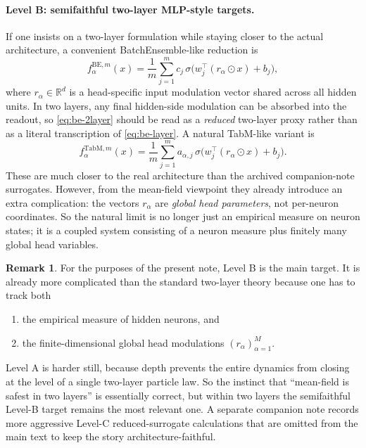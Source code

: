\documentclass[11pt]{article}
\theoremstyle{definition}
\newtheorem{remark}[theorem]{Remark}
\newcommand{\R}{\mathbb{R}}
\begin{document}
\paragraph{Level B: semifaithful two-layer MLP-style targets.}
If one insists on a two-layer formulation while staying closer to the actual architecture, a convenient BatchEnsemble-like reduction is
\begin{equation}
  f_{\alpha}^{\mathrm{BE},m}(x)
  =
  \frac1m\sum_{j=1}^m
  c_j\,\sigma\bigl(w_j^\top (r_\alpha\odot x)+b_j\bigr),
  \label{eq:be-2layer}
\end{equation}
where $r_\alpha\in\R^d$ is a head-specific input modulation vector shared across all hidden units.
In two layers, any final hidden-side modulation can be absorbed into the readout, so \eqref{eq:be-2layer} should be read as a \emph{reduced} two-layer proxy rather than as a literal transcription of \eqref{eq:be-layer}.
A natural TabM-like variant is
\begin{equation}
  f_{\alpha}^{\mathrm{TabM},m}(x)
  =
  \frac1m\sum_{j=1}^m
  a_{\alpha,j}\,\sigma\bigl(w_j^\top (r_\alpha\odot x)+b_j\bigr).
  \label{eq:tabm-2layer}
\end{equation}
These are much closer to the real architecture than the archived companion-note surrogates.
However, from the mean-field viewpoint they already introduce an extra complication:
the vectors $r_\alpha$ are \emph{global head parameters}, not per-neuron coordinates.
So the natural limit is no longer just an empirical measure on neuron states;
it is a coupled system consisting of a neuron measure plus finitely many global head variables.

\begin{remark}
For the purposes of the present note, Level B is the main target.
It is already more complicated than the standard two-layer theory because one has to track both
\begin{enumerate}[leftmargin=2em]
  \item the empirical measure of hidden neurons, and
  \item the finite-dimensional global head modulations $(r_\alpha)_{\alpha=1}^M$.
\end{enumerate}
Level A is harder still, because depth prevents the entire dynamics from closing at the level of a single two-layer particle law.
So the instinct that ``mean-field is safest in two layers'' is essentially correct, but within two layers the semifaithful Level-B target remains the most relevant one.
A separate companion note records more aggressive Level-C reduced-surrogate calculations that are omitted from the main text to keep the story architecture-faithful.
\end{remark}
\end{document}
